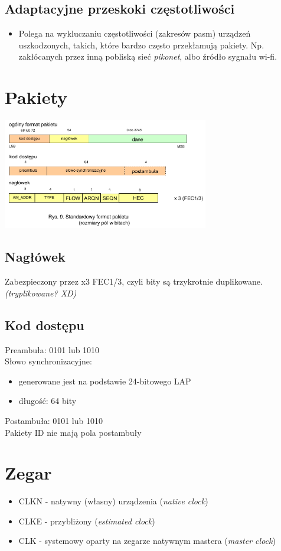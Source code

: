 \subsection{Adaptacyjne przeskoki częstotliwości}
\begin{itemize}
	\item Polega na wykluczaniu częstotliwości (zakresów pasm) urządzeń uszkodzonych, takich, które bardzo często przekłamują pakiety. Np. zakłócanych przez inną pobliską sieć \textit{pikonet}, albo źródło sygnału wi-fi.
\end{itemize}

\section{Pakiety}
\includegraphics[width=9cm]{./wyklady/Rysunek05.pdf}
\subsection{Nagłówek}
Zabezpieczony przez x3 FEC1/3, czyli bity są trzykrotnie duplikowane. \textit{(tryplikowane? XD)}\\
\subsection{Kod dostępu}
Preambuła: 0101 lub 1010\\
Słowo synchronizacyjne:
\begin{itemize}
	\item generowane jest na podstawie 24-bitowego LAP
	\item długość: 64 bity
\end{itemize}
Postambuła: 0101 lub 1010\\
Pakiety ID nie mają pola postambuły

\section{Zegar}
\begin{itemize}
	\item CLKN - natywny (własny) urządzenia (\emph{native clock})
	\item CLKE - przybliżony (\emph{estimated clock})
	\item CLK - systemowy oparty na zegarze natywnym mastera (\emph{master clock})
\end{itemize}

